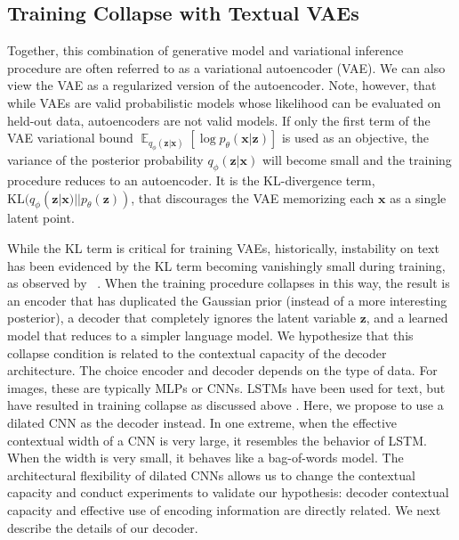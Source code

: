\documentclass{article}
\DeclareMathOperator{\E}{\mathbb{E}}
\begin{document}
\subsection{Training Collapse with Textual VAEs}

Together, this combination of generative model and variational inference procedure are often referred to as a variational autoencoder (VAE).
We can also view the VAE as a regularized version of the autoencoder. Note, however, that while VAEs are valid probabilistic models whose likelihood can be evaluated on held-out data, autoencoders are not valid models. If only the first
term of the VAE variational bound $\E_{q_{\phi}(\mathbf{z}|\mathbf{x})}[\log
p_\theta(\mathbf{x}|\mathbf{z})]$ is used as an objective,
the variance of the posterior probability $q_{\phi}(\mathbf{z}|\mathbf{x})$
will become small and the training procedure reduces to an autoencoder.
It is the KL-divergence term,
$\text{KL}(q_{\phi}(\mathbf{z}|\mathbf{x}) || p_{\theta}(\mathbf{z}))$, that discourages the VAE memorizing each $\mathbf{x}$ as a single
latent point.

While the KL term is critical for training VAEs, historically, instability on text has been evidenced by the KL term becoming vanishingly small during training, as observed by ~\citet{bowman2015generating}. When the training procedure collapses in this way, the result is an encoder that has duplicated the Gaussian prior (instead of a more interesting posterior), a decoder that completely ignores the latent variable $\mathbf{z}$, and a learned model that reduces to a simpler language model. We hypothesize that this collapse condition is related to the contextual capacity of the decoder architecture. The choice encoder and decoder depends on the type of data. For images, these are typically MLPs or CNNs. LSTMs have been used for text, but have resulted in training collapse as discussed above \cite{bowman2015generating}. Here, we propose to use a dilated CNN as the decoder instead. In one extreme, when the effective contextual width of a CNN is very large, it resembles the behavior of LSTM. When the width is very small, it behaves like a bag-of-words model. The architectural flexibility of dilated CNNs allows us to change the contextual capacity and conduct experiments to validate our hypothesis:
decoder contextual capacity and effective use of encoding information are directly related.
 We next describe the details of our decoder.
\end{document}
